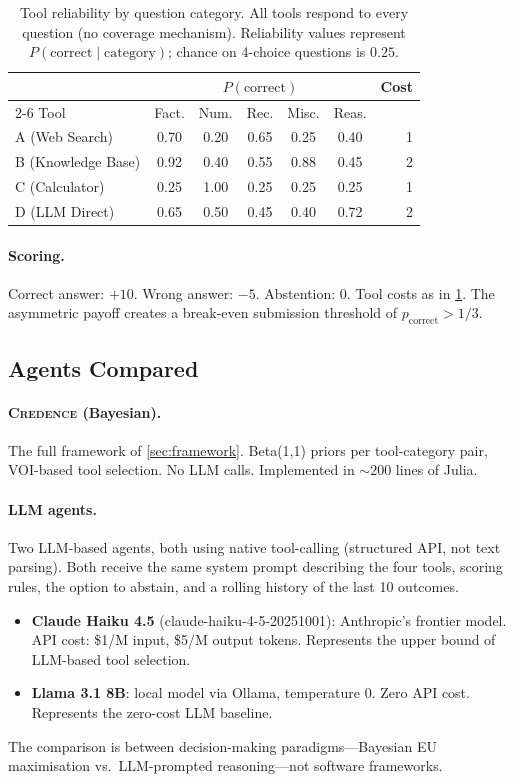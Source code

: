 \documentclass[11pt]{article}
\newcommand{\credence}{\textsc{Credence}}
\begin{document}
\begin{table}[t]
\centering
\caption{Tool reliability by question category. All tools respond to every question (no coverage mechanism). Reliability values represent $P(\text{correct} \mid \text{category})$; chance on 4-choice questions is $0.25$.}
\label{tab:tools}
\small
\begin{tabular}{@{}lcccccr@{}}
\toprule
& \multicolumn{5}{c}{$P(\text{correct})$} & Cost \\
\cmidrule(lr){2-6}
Tool & Fact. & Num. & Rec. & Misc. & Reas. & \\
\midrule
A (Web Search)      & 0.70 & 0.20 & 0.65 & 0.25 & 0.40 & 1 \\
B (Knowledge Base)  & 0.92 & 0.40 & 0.55 & 0.88 & 0.45 & 2 \\
C (Calculator)      & 0.25 & 1.00 & 0.25 & 0.25 & 0.25 & 1 \\
D (LLM Direct)      & 0.65 & 0.50 & 0.45 & 0.40 & 0.72 & 2 \\
\bottomrule
\end{tabular}
\end{table}

\paragraph{Scoring.} Correct answer: $+10$. Wrong answer: $-5$. Abstention: $0$. Tool costs as in \cref{tab:tools}. The asymmetric payoff creates a break-even submission threshold of $p_{\text{correct}} > 1/3$.

\subsection{Agents Compared}

\paragraph{\credence{} (Bayesian).} The full framework of \cref{sec:framework}. Beta(1,1) priors per tool-category pair, VOI-based tool selection. No LLM calls. Implemented in ${\sim}200$ lines of Julia.

\paragraph{LLM agents.} Two LLM-based agents, both using native tool-calling (structured API, not text parsing). Both receive the same system prompt describing the four tools, scoring rules, the option to abstain, and a rolling history of the last 10 outcomes.
\begin{itemize}
\item \textbf{Claude Haiku 4.5} (claude-haiku-4-5-20251001): Anthropic's frontier model. API cost: \$1/M input, \$5/M output tokens. Represents the upper bound of LLM-based tool selection.
\item \textbf{Llama 3.1 8B}: local model via Ollama, temperature 0. Zero API cost. Represents the zero-cost LLM baseline.
\end{itemize}
The comparison is between decision-making paradigms---Bayesian EU maximisation vs.\ LLM-prompted reasoning---not software frameworks.
\end{document}
